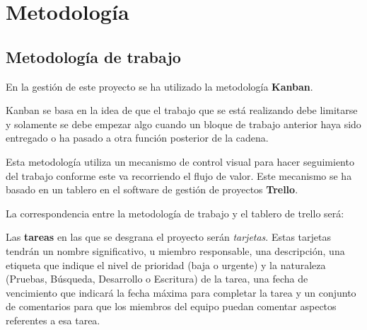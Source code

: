 \documentclass[../main.tex]{subfiles}
\begin{document}
\chapter{Metodología}\label{ch:metodologia}

\section{Metodología de trabajo}

En la gestión de este proyecto se ha utilizado la metodología \textbf{Kanban}.

Kanban se basa en la idea de que el trabajo que se está realizando debe limitarse y solamente se debe empezar algo cuando un bloque de trabajo anterior haya sido entregado o ha pasado a otra función posterior de la cadena.\cite{}

Esta metodología utiliza un mecanismo de control visual para hacer seguimiento del trabajo conforme este va recorriendo el flujo de valor. Este mecanismo se ha basado en un tablero en el software de gestión de proyectos \textbf{Trello}\cite{}.

La correspondencia entre la metodología de trabajo y el tablero de trello será:

Las \textbf{tareas} en las que se desgrana el proyecto serán \textit{tarjetas}. Estas tarjetas tendrán un nombre significativo, u  miembro responsable, una descripción, una etiqueta que indique el nivel de prioridad (baja o urgente) y la naturaleza (Pruebas, Búsqueda, Desarrollo o Escritura) de la tarea, una fecha de vencimiento que indicará la fecha máxima para completar la tarea y un conjunto de comentarios para que los miembros del equipo puedan comentar aspectos referentes a esa tarea.
\end{document}
